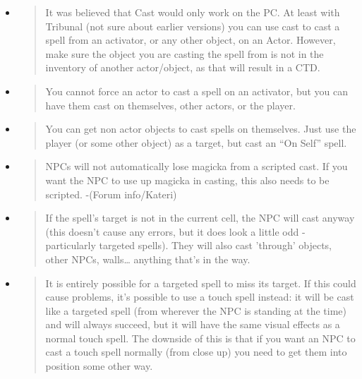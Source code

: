 \begin{itemize}
\item
  \begin{quote}
  It was believed that Cast would only work on the PC. At least with
  Tribunal (not sure about earlier versions) you can use cast to cast a
  spell from an activator, or any other object, on an Actor. However,
  make sure the object you are casting the spell from is not in the
  inventory of another actor/object, as that will result in a CTD.
  \end{quote}
\item
  \begin{quote}
  You cannot force an actor to cast a spell on an activator, but you can
  have them cast on themselves, other actors, or the player.
  \end{quote}
\item
  \begin{quote}
  You can get non actor objects to cast spells on themselves. Just use
  the player (or some other object) as a target, but cast an ``On Self''
  spell.
  \end{quote}
\item
  \begin{quote}
  NPCs will not automatically lose magicka from a scripted cast. If you
  want the NPC to use up magicka in casting, this also needs to be
  scripted. -(Forum info/Kateri)
  \end{quote}
\item
  \begin{quote}
  If the spell's target is not in the current cell, the NPC will cast
  anyway (this doesn't cause any errors, but it does look a little odd -
  particularly targeted spells). They will also cast 'through' objects,
  other NPCs, walls\ldots{} anything that's in the way.
  \end{quote}
\item
  \begin{quote}
  It is entirely possible for a targeted spell to miss its target. If
  this could cause problems, it's possible to use a touch spell instead:
  it will be cast like a targeted spell (from wherever the NPC is
  standing at the time) and will always succeed, but it will have the
  same visual effects as a normal touch spell. The downside of this is
  that if you want an NPC to cast a touch spell normally (from close up)
  you need to get them into position some other way.
  \end{quote}
\end{itemize}

